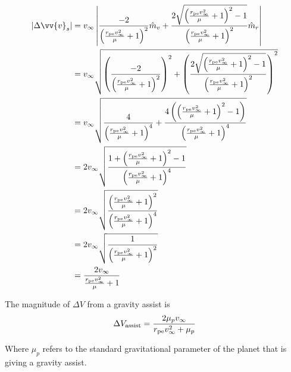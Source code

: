 \documentclass{article}
\begin{document}
\begin{align*}
    |\Delta\vv{v}_s| & = v_\infty\left|\frac{-2}{\left(\frac{r_\text{pe}v_\infty^2}{\mu}+1\right)^2}\hat{m}_v+\frac{2\sqrt{\left(\frac{r_\text{pe}v_\infty^2}{\mu}+1\right)^2-1}}{\left(\frac{r_\text{pe}v_\infty^2}{\mu}+1\right)^2}\hat{m}_r\right|       \\
                     & = v_\infty\sqrt{\left(\frac{-2}{\left(\frac{r_\text{pe}v_\infty^2}{\mu}+1\right)^2}\right)^2+\left(\frac{2\sqrt{\left(\frac{r_\text{pe}v_\infty^2}{\mu}+1\right)^2-1}}{\left(\frac{r_\text{pe}v_\infty^2}{\mu}+1\right)^2}\right)^2} \\
                     & = v_\infty\sqrt{\frac{4}{\left(\frac{r_\text{pe}v_\infty^2}{\mu}+1\right)^4}+\frac{4\left(\left(\frac{r_\text{pe}v_\infty^2}{\mu}+1\right)^2-1\right)}{\left(\frac{r_\text{pe}v_\infty^2}{\mu}+1\right)^4}}                          \\
                     & = 2v_\infty\sqrt{\frac{1+\left(\frac{r_\text{pe}v_\infty^2}{\mu}+1\right)^2-1}{\left(\frac{r_\text{pe}v_\infty^2}{\mu}+1\right)^4}}                                                                                                  \\
                     & = 2v_\infty\sqrt{\frac{\left(\frac{r_\text{pe}v_\infty^2}{\mu}+1\right)^2}{\left(\frac{r_\text{pe}v_\infty^2}{\mu}+1\right)^4}}                                                                                                      \\
                     & = 2v_\infty\sqrt{\frac{1}{\left(\frac{r_\text{pe}v_\infty^2}{\mu}+1\right)^2}}                                                                                                                                                       \\
                     & = \frac{2v_\infty}{\frac{r_\text{pe}v_\infty^2}{\mu}+1}                                                                                                                                                                              \\
\end{align*}

The magnitude of $\Delta V$ from a gravity assist is
\begin{equation}\label{Gravity Assist Delta V}
    \Delta V_\text{assist}=\frac{2\mu_p v_\infty}{r_\text{pe}v_\infty^2+\mu_p}\\
\end{equation}

Where $\mu_p$ refers to the standard gravitational parameter of the planet that is giving a gravity assist.
\end{document}
